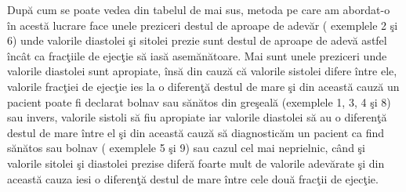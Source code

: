 Dup\u{a} cum se poate vedea din tabelul de mai sus, metoda pe care am abordat-o \^{i}n acest\u{a} lucrare face unele preziceri destul de aproape de adev\u{a}r ( exemplele 2 \c{s}i 6) unde valorile diastolei \c{s}i sitolei prezie sunt destul de aproape de adev\u{a} astfel \^{i}nc\^{a}t ca frac\c{t}iile de ejec\c{t}ie s\u{a} ias\u{a} asem\u{a}n\u{a}toare. Mai sunt unele preziceri unde valorile diastolei sunt apropiate, \^{i}ns\u{a} din cauz\u{a} c\u{a} valorile sistolei difere \^{i}ntre ele, valorile frac\c{t}iei de ejec\c{t}ie ies la o diferen\c{t}\u{a} destul de mare \c{s}i din aceast\u{a} cauz\u{a} un pacient poate fi declarat bolnav sau s\u{a}n\u{a}tos din gre\c{s}eal\u{a} (exemplele 1, 3, 4 \c{s}i 8) sau invers, valorile sistoli s\u{a} fiu apropiate iar valorile diastolei s\u{a} au o diferen\c{t}\u{a} destul de mare \^{i}ntre el \c{s}i din aceast\u{a} cauz\u{a} s\u{a} diagnostic\u{a}m un pacient ca find s\u{a}n\u{a}tos sau bolnav ( exemplele 5 \c{s}i 9) sau cazul cel mai neprielnic, c\^{a}nd \c{s}i valorile sitolei \c{s}i diastolei prezise difer\u{a} foarte mult de valorile adev\u{a}rate \c{s}i din aceast\u{a} cauza iesi o diferen\c{t}\u{a} destul de mare \^{i}ntre cele dou\u{a} frac\c{t}ii de ejec\c{t}ie.